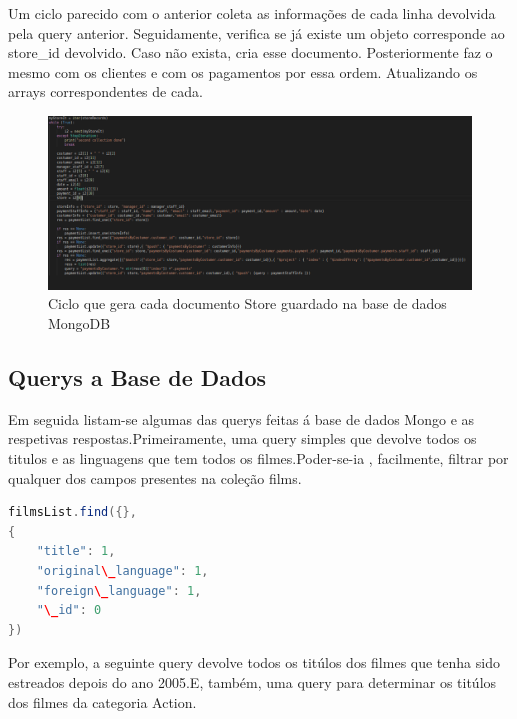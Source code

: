  
\par Um ciclo parecido com o anterior coleta as informações de cada linha devolvida pela query anterior. Seguidamente, verifica se já existe um objeto corresponde ao store\_id devolvido. Caso não exista, cria esse documento. Posteriormente faz o mesmo com os clientes e com os pagamentos por essa ordem. Atualizando os arrays correspondentes de cada.

\begin{figure}[H]

  \centering

  \includegraphics[width=\textwidth]{PovoamentoMongo2.png}

  \caption {Ciclo que gera cada documento Store guardado na base de dados MongoDB}

  \label {fig:Mongo2}

\end{figure}


\subsection{Querys a Base de Dados}

Em seguida listam-se algumas das querys feitas á base de dados Mongo e as respetivas respostas.Primeiramente, uma query simples que devolve todos os titulos e as linguagens que tem todos os filmes.Poder-se-ia , facilmente, filtrar por qualquer dos campos presentes na coleção films.

\begin{lstlisting}[language=java,caption=Query ao Mongo para devolver todos os Filmes]
filmsList.find({},
{
	"title": 1, 
	"original\_language": 1, 
	"foreign\_language": 1,
	"\_id": 0
})
\end{lstlisting}

Por exemplo, a seguinte query devolve todos os titúlos dos filmes que tenha sido estreados depois do ano 2005.E, também, uma query para determinar os titúlos dos filmes da categoria Action.

